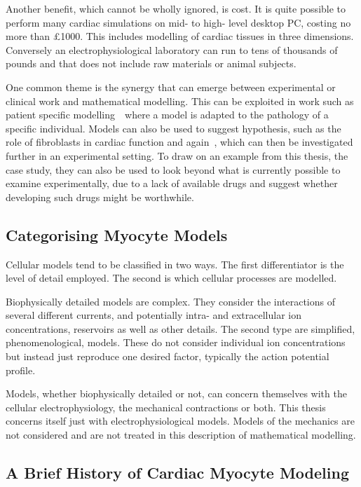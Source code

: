 Another benefit, which cannot be wholly ignored, is cost.
It is quite possible to perform many cardiac simulations on mid- to high- level
desktop PC, costing no more than \pounds 1000.
This includes modelling of cardiac tissues in three dimensions.
Conversely an electrophysiological laboratory can run to tens of thousands of
pounds and that does not include raw materials or animal subjects.

One common theme is the synergy that can emerge between experimental or clinical
work and mathematical modelling.
This can be exploited in work such as patient specific
modelling~\cite{Sermesant2006,Ramanathan2006}\ where a model is adapted to the pathology of a
specific individual.
Models can also be used to suggest hypothesis, such as the role of fibroblasts
in cardiac function and again~\cite{Kohl2005}, which can then be investigated
further in an experimental setting.
To draw on an example from this thesis, the  case study, they can
also be used to look beyond what is currently possible to examine
experimentally, due to a lack of available drugs and suggest whether developing
such drugs might be worthwhile.

\subsection{Categorising Myocyte Models}

Cellular models tend to be classified in two ways.
The first differentiator is the level of detail employed.
The second is which cellular processes are modelled.

Biophysically detailed models are complex.
They consider the interactions of several different currents, and potentially
intra- and extracellular ion concentrations, reservoirs as well as other
details.
The second type are simplified, phenomenological, models.
These do not consider individual ion concentrations but instead just reproduce
one desired factor, typically the action potential profile.

Models, whether biophysically detailed or not, can concern themselves with the
cellular electrophysiology, the mechanical contractions or both.
This thesis concerns itself just with electrophysiological models.
Models of the mechanics are not considered and are not treated in this
description of mathematical modelling.

\subsection{A Brief History of Cardiac Myocyte Modeling}

